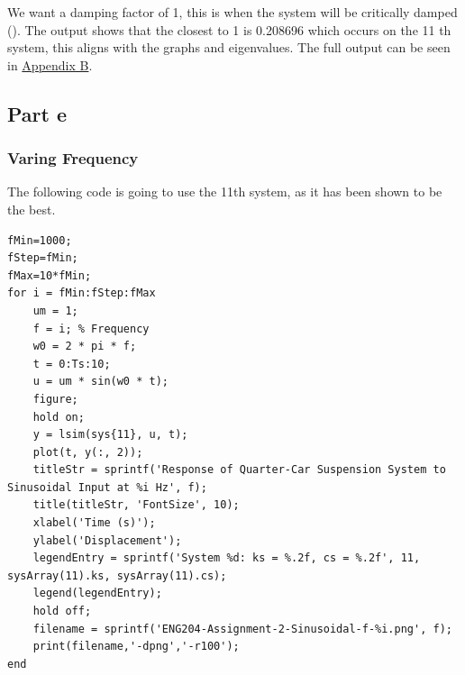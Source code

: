 \documentclass[11pt]{article}
\begin{document}
We want a damping factor of 1, this is when the system will be critically damped (\cite{WikipediaDamping}). The output shows that the closest to 1 is 0.208696 which occurs on the 11 th system, this aligns with the graphs and eigenvalues. The full output can be seen in \hyperref[sec:org2a10006]{Appendix B}.
\subsection{Part e}
\label{sec:orgdd4ad96}
\subsubsection{Varing Frequency}
\label{sec:orgfb1537d}
The following code is going to use the 11th system, as it has been shown to be the best.
\begin{verbatim}
fMin=1000;
fStep=fMin;
fMax=10*fMin;
for i = fMin:fStep:fMax
    um = 1;
    f = i; % Frequency
    w0 = 2 * pi * f;
    t = 0:Ts:10;
    u = um * sin(w0 * t);
    figure;
    hold on;
    y = lsim(sys{11}, u, t);
    plot(t, y(:, 2));
    titleStr = sprintf('Response of Quarter-Car Suspension System to Sinusoidal Input at %i Hz', f);
    title(titleStr, 'FontSize', 10);
    xlabel('Time (s)');
    ylabel('Displacement');
    legendEntry = sprintf('System %d: ks = %.2f, cs = %.2f', 11, sysArray(11).ks, sysArray(11).cs);
    legend(legendEntry);
    hold off;
    filename = sprintf('ENG204-Assignment-2-Sinusoidal-f-%i.png', f);
    print(filename,'-dpng','-r100');
end
\end{verbatim}
\end{document}
